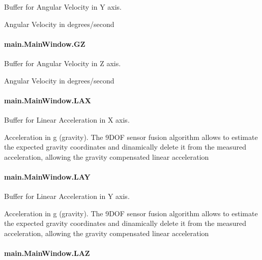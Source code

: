 Buffer for Angular Velocity in Y axis. 

Angular Velocity in degrees/second \hypertarget{classmain_1_1_main_window_aa03dbf9da18079ab07a57ebf5e523b58}{
\paragraph[{G\-Z}]{\setlength{\rightskip}{0pt plus 5cm}main.\-Main\-Window.\-G\-Z}}\label{classmain_1_1_main_window_aa03dbf9da18079ab07a57ebf5e523b58}


Buffer for Angular Velocity in Z axis. 

Angular Velocity in degrees/second \hypertarget{classmain_1_1_main_window_a689266200b7e4956e7e5c0fa52093dda}{
\paragraph[{L\-A\-X}]{\setlength{\rightskip}{0pt plus 5cm}main.\-Main\-Window.\-L\-A\-X}}\label{classmain_1_1_main_window_a689266200b7e4956e7e5c0fa52093dda}


Buffer for Linear Acceleration in X axis. 

Acceleration in g (gravity). The 9\-D\-O\-F sensor fusion algorithm allows to estimate the expected gravity coordinates and dinamically delete it from the measured acceleration, allowing the gravity compensated linear acceleration \hypertarget{classmain_1_1_main_window_a6da1afdc121f84b6eb02beb0db52049a}{
\paragraph[{L\-A\-Y}]{\setlength{\rightskip}{0pt plus 5cm}main.\-Main\-Window.\-L\-A\-Y}}\label{classmain_1_1_main_window_a6da1afdc121f84b6eb02beb0db52049a}


Buffer for Linear Acceleration in Y axis. 

Acceleration in g (gravity). The 9\-D\-O\-F sensor fusion algorithm allows to estimate the expected gravity coordinates and dinamically delete it from the measured acceleration, allowing the gravity compensated linear acceleration \hypertarget{classmain_1_1_main_window_af8a0057e50f3209b22653600a36db22a}{
\paragraph[{L\-A\-Z}]{\setlength{\rightskip}{0pt plus 5cm}main.\-Main\-Window.\-L\-A\-Z}}\label{classmain_1_1_main_window_af8a0057e50f3209b22653600a36db22a}


